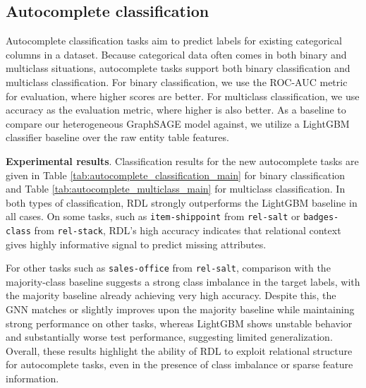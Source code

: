 \documentclass{article} %
\newcommand{\stack}{\texttt{rel-stack}\xspace}
\newcommand{\salt}{\texttt{rel-salt}\xspace}
\begin{document}
\begin{table}[t]
  \centering
  \caption{{\bf Full list of new autocomplete tasks.} Autocomplete tasks aim to make predictions on existing columns in the dataset.}
  \label{tab:tasks_autocomplete}
  \renewcommand{\arraystretch}{1.1}
  \scriptsize
  \vspace{-5pt}
  \resizebox{\textwidth}{!}{
    
  }
  \vspace{-10pt}
\end{table}

\subsection{Autocomplete classification} \label{sec:autocomplete-classification}

Autocomplete classification tasks aim to predict labels for existing categorical columns in a dataset. Because categorical data often comes in both binary and multiclass situations, autocomplete tasks support both binary classification and multiclass classification. For binary classification, we use the ROC-AUC \citep{hanley1983method} metric for evaluation, where higher scores are better. For multiclass classification, we use accuracy as the evaluation metric, where higher is also better. As a baseline to compare our heterogeneous GraphSAGE model against, we utilize a LightGBM classifier baseline over the raw entity table features.

\textbf{Experimental results}. Classification results for the new autocomplete tasks are given in Table \ref{tab:autocomplete_classification_main} for binary classification and Table \ref{tab:autocomplete_multiclass_main} for multiclass classification. In both types of classification, RDL strongly outperforms the LightGBM baseline in all cases. On some tasks, such as \texttt{item-shippoint} from \salt or \texttt{badges-class} from \stack, RDL's high accuracy indicates that relational context gives highly informative signal to predict missing attributes.

For other tasks such as \texttt{sales-office} from \salt, comparison with the majority-class baseline suggests a strong class imbalance in the target labels, with the majority baseline already achieving very high accuracy. Despite this, the GNN matches or slightly improves upon the majority baseline while maintaining strong performance on other tasks, whereas LightGBM shows unstable behavior and substantially worse test performance, suggesting limited generalization. Overall, these results highlight the ability of RDL to exploit relational structure for autocomplete tasks, even in the presence of class imbalance or sparse feature information.
\end{document}
